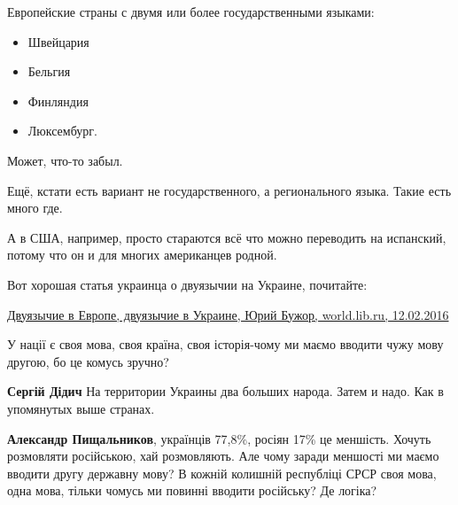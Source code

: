 \begin{itemize}
\begin{itemize}
Европейские страны с двумя или более государственными языками:

\begin{itemize}
  \item Швейцария
  \item Бельгия
  \item Финляндия
  \item Люксембург.
\end{itemize}

Может, что-то забыл.

Ещё, кстати есть вариант не государственного, а регионального языка. Такие есть
много где.

А в США, например, просто стараются всё что можно переводить на испанский,
потому что он и для многих американцев родной.

Вот хорошая статья украинца о двуязычии на Украине, почитайте:

\href{http://world.lib.ru/j/jurij_j_b/dwujazychiewewropedwujazychiewukpaine.shtml}{%
Двуязычие в Европе, двуязычие в Украине, Юрий Бужор, world.lib.ru, 12.02.2016%
}

 

У нації є своя мова, своя країна, своя історія-чому ми маємо вводити чужу мову другою, бо це комусь зручно?

 
\textbf{Сергій Дідич} На территории Украины два больших народа. Затем и надо. Как в упомянутых выше странах.

 
\textbf{Александр Пищальников}, українців 77,8\%, росіян 17\% це меншість. Хочуть
розмовляти російською, хай розмовляють. Але чому заради меншості ми маємо
вводити другу державну мову? В кожній колишній республіці СРСР своя мова, одна
мова, тільки чомусь ми повинні вводити російську? Де логіка?

 

\end{itemize}
\end{itemize}
